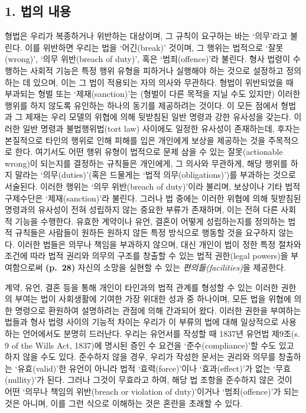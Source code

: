 \documentclass[12pt, oneside]{book}  %
\begin{document}
\subsection{\texorpdfstring{\textbf{1. 법의
내용}}{1. 법의 내용}}\label{uxbc95uxc758-uxb0b4uxc6a9}

형법은 우리가 복종하거나 위반하는 대상이며, 그 규칙이 요구하는 바는
`의무'라고 불린다. 이를 위반하면 우리는 법을 `어긴(break)' 것이며, 그
행위는 법적으로 `잘못(wrong)', `의무 위반(breach of duty)', 혹은
`범죄(offence)'라 불린다. 형사 법령이 수행하는 사회적 기능은 특정 행위
유형을 피하거나 실행해야 하는 것으로 설정하고 정의하는 데 있으며, 이는
그 법이 적용되는 자의 의사와 무관하다. 형법이 위반되었을 때 부과되는
형벌 또는 `제재(sanction)'는 (형벌이 다른 목적을 지닐 수도 있지만)
이러한 행위를 하지 않도록 유인하는 하나의 동기를 제공하려는 것이다. 이
모든 점에서 형법과 그 제재는 우리 모델의 위협에 의해 뒷받침된 일반
명령과 강한 유사성을 갖는다. 이러한 일반 명령과 불법행위법(tort law)
사이에도 일정한 유사성이 존재하는데, 후자는 본질적으로 타인의 행위로
인해 피해를 입은 개인에게 보상을 제공하는 것을 주목적으로 한다. 여기서도
어떤 행위 유형이 법적으로 문제 삼을 수 있는 잘못(actionable wrong)이
되는지를 결정하는 규칙들은 개인에게, 그 의사와 무관하게, 해당 행위를
하지 말라는 `의무(duties)'(혹은 드물게는 `법적 의무(obligations)')를
부과하는 것으로 서술된다. 이러한 행위는 `의무 위반(breach of duty)'이라
불리며, 보상이나 기타 법적 구제수단은 `제재(sanction)'라 불린다. 그러나
법 중에는 이러한 위협에 의해 뒷받침된 명령과의 유사성이 전혀 성립하지
않는 중요한 부류가 존재하며, 이는 전혀 다른 사회적 기능을 수행한다.
유효한 계약이나 유언, 결혼이 어떻게 성립하는지를 정의하는 법적 규칙들은
사람들이 원하든 원하지 않든 특정 방식으로 행동할 것을 요구하지 않는다.
이러한 법들은 의무나 책임을 부과하지 않으며, 대신 개인이 법이 정한 특정
절차와 조건에 따라 법적 권리와 의무의 구조를 창출할 수 있는 법적
권한(legal powers)을 부여함으로써 \textbf{(p.~28)} 자신의 소망을 실현할
수 있는 \emph{편의들(facilities)}을 제공한다.

계약, 유언, 결혼 등을 통해 개인이 타인과의 법적 관계를 형성할 수 있는
이러한 권한의 부여는 법이 사회생활에 기여한 가장 위대한 성과 중
하나이며, 모든 법을 위협에 의한 명령으로 환원하여 설명하려는 관점에 의해
간과되어 왔다. 이러한 권한을 부여하는 법들과 형사 법령 사이의 기능적
차이는 우리가 이 부류의 법에 대해 일상적으로 사용하는 언어에서도 분명히
드러난다. 우리는 유언서를 작성할 때 1837년 유언법 제9조(s. 9 of the
Wills Act, 1837)에 명시된 증인 수 요건을 `준수(compliance)'할 수도 있고
하지 않을 수도 있다. 준수하지 않을 경우, 우리가 작성한 문서는 권리와
의무를 창출하는 `유효(valid)'한 유언이 아니라 법적 `효력(force)'이나
`효과(effect)'가 없는 `무효(nullity)'가 된다. 그러나 그것이 무효라고
하여, 해당 법 조항을 준수하지 않은 것이 어떤 `의무나 책임의 위반(breach
or violation of duty)'이거나 `범죄(offence)'가 되는 것은 아니며, 이를
그런 식으로 이해하는 것은 혼란을 초래할 수 있다.
\end{document}
